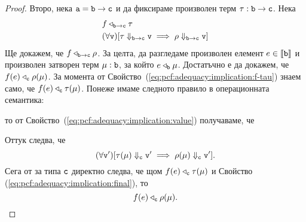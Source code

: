 \begin{proof}
  Второ, нека $\vv{a} = \vv{b} \to \vv{c}$ и да фиксираме произволен терм $\tau : \vv{b} \to \vv{c}$.
  Нека
  \begin{align}
    & f \triangleleft_{\vv{b}\to\vv{c}} \tau \label{eq:pcf:adequacy:implication:f-tau}\\
    & (\forall \vv{v})[\tau \Downarrow_{\vv{b}\to\vv{c}} \vv{v} \implies \rho \Downarrow_{\vv{b}\to\vv{c}} \vv{v}] \label{eq:pcf:adequacy:implication:value}
  \end{align}
  Ще докажем, че $f \triangleleft_{\vv{b} \to \vv{c}} \rho$.
  За целта, да разгледаме произволен елемент $e \in \val{\vv{b}}$ и произволен затворен терм $\mu : \vv{b}$, за който $e \triangleleft_{\vv{b}} \mu$.
  Достатъчно е да докажем, че $f(e) \triangleleft_{\vv{c}} \rho(\mu)$.
  За момента от Свойство~(\ref{eq:pcf:adequacy:implication:f-tau}) знаем само, че $f(e) \triangleleft_{\vv{c}} \tau(\mu)$.
  Понеже имаме следното правило в операционната семантика:
  \begin{prooftree}
  \end{prooftree}
  то от Свойство~(\ref{eq:pcf:adequacy:implication:value}) получаваме, че
  \begin{prooftree}
  \end{prooftree}
  Оттук следва, че
  \begin{equation}
    \label{eq:pcf:adequacy:implication:final}
    (\forall \vv{v}')[\tau(\mu) \Downarrow_{\vv{c}} \vv{v}' \implies \rho(\mu) \Downarrow_{\vv{c}} \vv{v}'].
  \end{equation}
  Сега от \IndHyp за типа $\vv{c}$ директно следва, че щом $f(e) \triangleleft_{\vv{c}}\tau(\mu)$ и Свойство (\ref{eq:pcf:adequacy:implication:final}), то \[f(e) \triangleleft_{\vv{c}} \rho(\mu).\]
\end{proof}




